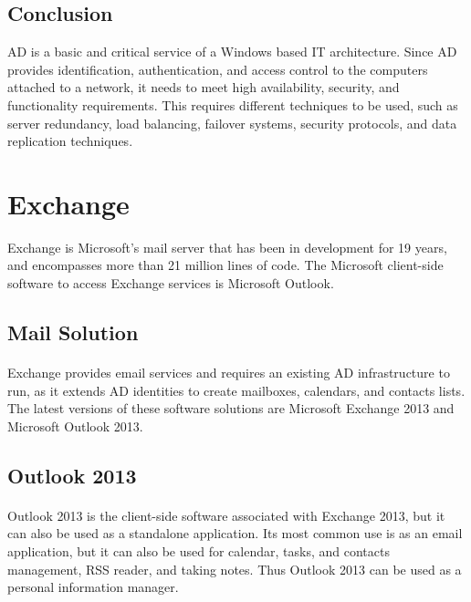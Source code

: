 \subsection{Conclusion}
AD is a basic and critical service of a Windows based IT architecture. Since AD provides identification, authentication, and access control to the computers attached to a network, it needs to meet high availability, security, and functionality requirements.
This requires different techniques to be used, such as server redundancy, load balancing, failover systems, security protocols, and data \linebreak[4]replication techniques.


\section{Exchange}

Exchange is Microsoft's mail server that has been in development for 19 years, and encompasses more than 21 million lines of code.
The Microsoft client-side software to access Exchange services is Microsoft Outlook.

\subsection{Mail Solution}
\paragraph{}
 Exchange provides email services and requires an existing AD infrastructure to run, as it extends AD identities to create mailboxes, calendars, and contacts lists\cite[Ch. 1]{redmond_microsoft_2010}.
The latest versions of these software solutions are Microsoft Exchange 2013 and Microsoft Outlook 2013.

\subsection{Outlook 2013}
\paragraph{}
Outlook 2013 is the client-side software associated with Exchange 2013, but it can also be used as a standalone application. Its most common use is as an email application, but it can also be used for calendar, tasks, and contacts management, RSS reader, and taking notes. Thus Outlook 2013 can be used as a personal information manager.

